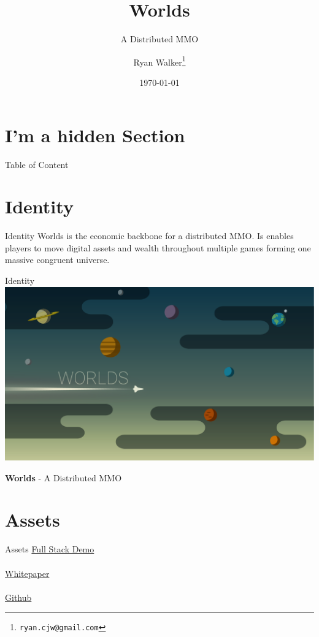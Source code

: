 \documentclass[final, ngerman, xcolor=pdftex, dvipsnames, table, aspectratio=169, 14pt]{beamer}
\begin{document}
\title[Worlds]{Worlds}
\subtitle[]{A Distributed MMO}
\author[]{Ryan Walker\footnote{\texttt{ryan.cjw@gmail.com}}}
\date{\today} %


\begin{frame}
  \maketitle
\end{frame}

\section*{I'm a hidden Section}
\begin{frame}{Table of Content} %
    \small 
    \tableofcontents
\end{frame}

\section{Identity}
\begin{frame}{Identity}
Worlds is the economic backbone for a distributed MMO. Is enables players to move digital assets and wealth throughout multiple games forming one massive congruent universe. 
\end{frame}

\begin{frame}{Identity}
\centering
\includegraphics[scale=0.15]{Header.png} 

\textbf{Worlds} - A Distributed MMO
\end{frame}

\section{Assets}
\begin{frame}{Assets}
\href{https://www.youtube.com/watch?v=OrOZVr-j92A}{Full Stack Demo}
\\~\\

\href{https://github.com/Machine-Hum/Worlds/raw/master/Worlds-Whitepaper/whitepaper.pdf}{Whitepaper}
\\~\\

\href{worldsmmo.com}{Github}
\end{frame}
\end{document}
